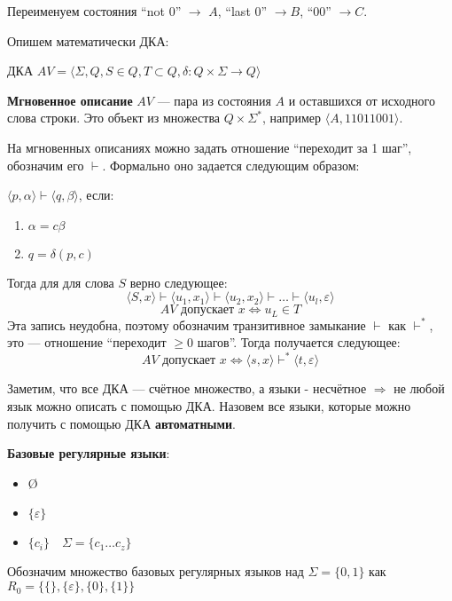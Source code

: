 Переименуем состояния ``not $0$'' $\to$ $A$, ``last $0$'' $\to B$, ``$00$'' $\to C$.

Опишем математически ДКА:

\begin{definition}
    ДКА $AV=\langle \Sigma, Q, S\in Q, T\subset Q, \delta:Q\times\Sigma\to Q\rangle$

    \textbf{Мгновенное описание} $AV$ --- пара из состояния $A$ и оставшихся от исходного слова строки. Это объект из множества $Q\times \Sigma^*$, например $\langle A, 11011001\rangle$.

    На мгновенных описаниях можно задать отношение ``переходит за 1 шаг'', обозначим его $\vdash$. Формально оно задается следующим образом:

    $\langle p, \alpha\rangle\vdash \langle q, \beta\rangle$, если:
    \begin{enumerate}
        \item $\alpha=c\beta$
        \item $q=\delta(p, c)$
    \end{enumerate}

    Тогда для для слова $S$ верно следующее:
    $$\langle S, x\rangle\vdash \langle u_1, x_1\rangle\vdash\langle u_2, x_2\rangle\vdash\ldots\vdash \langle u_l, \varepsilon\rangle$$
    $$AV \text{ допускает } x \Leftrightarrow u_L\in T$$
    Эта запись неудобна, поэтому обозначим транзитивное замыкание $\vdash$ как $\vdash^*$, это --- отношение ``переходит $\geq 0$ шагов''. Тогда получается следующее:
    $$AV \text{ допускает } x \Leftrightarrow \langle s, x\rangle\vdash^*\langle t, \varepsilon\rangle$$
\end{definition}

Заметим, что все ДКА --- счётное множество, а языки - несчётное $\Rightarrow$ не любой язык можно описать с помощью ДКА. Назовем все языки, которые можно получить с помощью ДКА \textbf{автоматными}.

\begin{definition}
    \textbf{Базовые регулярные языки}:
    \begin{itemize}
        \item \O
        \item $\{\varepsilon\}$
        \item $\{c_i\} \quad \Sigma=\{c_1\ldots c_z\}$
    \end{itemize}
\end{definition}

Обозначим множество базовых регулярных языков над $\Sigma=\{0, 1\}$ как $R_0=\{\{\}, \{\varepsilon\}, \{0\}, \{1\}\}$

